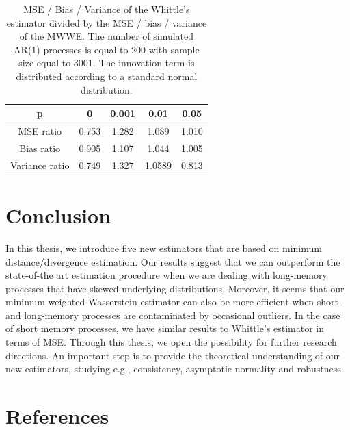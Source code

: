 \documentclass[
  11pt,
]{article}
\begin{document}
\begin{table}[h]
\centering
\begin{tabular}{|c|c|c|c|c|}
\hline
p  &  0  & 0.001   & 0.01    & 0.05 \\
\hline
MSE ratio  & 0.753 & 1.282 & 1.089 & 1.010 \\
\hline
Bias ratio & 0.905 & 1.107 & 1.044 & 1.005\\
\hline 
Variance ratio & 0.749 & 1.327 & 1.0589 & 0.813 \\ 
\hline
\end{tabular}
\caption{MSE / Bias / Variance of the Whittle's estimator divided by the MSE / bias / variance of the MWWE. The number of simulated AR(1) processes is equal to 200 with sample size equal to 3001. The innovation term is distributed according to a standard normal distribution.}
\label{tab:outliers_AR1}
\end{table}

\hypertarget{conclusion}{%
\section{Conclusion}\label{conclusion}}

In this thesis, we introduce five new estimators that are based on
minimum distance/divergence estimation. Our results suggest that we can
outperform the state-of-the art estimation procedure when we are dealing
with long-memory processes that have skewed underlying distributions.
Moreover, it seems that our minimum weighted Wasserstein estimator can
also be more efficient when short- and long-memory processes are
contaminated by occasional outliers. In the case of short memory
processes, we have similar results to Whittle's estimator in terms of
MSE. Through this thesis, we open the possibility for further research
directions. An important step is to provide the theoretical
understanding of our new estimators, studying e.g., consistency,
asymptotic normality and robustness.

\newpage

\hypertarget{references}{%
\section*{References}\label{references}}
\end{document}
